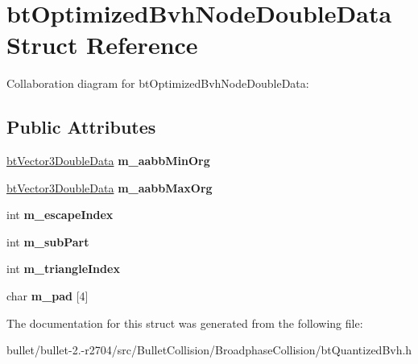 \hypertarget{structbt_optimized_bvh_node_double_data}{\section{bt\+Optimized\+Bvh\+Node\+Double\+Data Struct Reference}
\label{structbt_optimized_bvh_node_double_data}
}


Collaboration diagram for bt\+Optimized\+Bvh\+Node\+Double\+Data\+:
\subsection*{Public Attributes}
\begin{DoxyCompactItemize}
\item 
\hypertarget{structbt_optimized_bvh_node_double_data_ad80b6c98ad8bc8eb09343a9323fbb574}{\hyperlink{structbt_vector3_double_data}{bt\+Vector3\+Double\+Data} {\bfseries m\+\_\+aabb\+Min\+Org}}\label{structbt_optimized_bvh_node_double_data_ad80b6c98ad8bc8eb09343a9323fbb574}

\item 
\hypertarget{structbt_optimized_bvh_node_double_data_ac4af6af6c427e2cf8f1bbe59d2675f4e}{\hyperlink{structbt_vector3_double_data}{bt\+Vector3\+Double\+Data} {\bfseries m\+\_\+aabb\+Max\+Org}}\label{structbt_optimized_bvh_node_double_data_ac4af6af6c427e2cf8f1bbe59d2675f4e}

\item 
\hypertarget{structbt_optimized_bvh_node_double_data_a2908fce871eac515aad788bd9981a295}{int {\bfseries m\+\_\+escape\+Index}}\label{structbt_optimized_bvh_node_double_data_a2908fce871eac515aad788bd9981a295}

\item 
\hypertarget{structbt_optimized_bvh_node_double_data_ae113561e2ba8017196dcfe9a86bc3b56}{int {\bfseries m\+\_\+sub\+Part}}\label{structbt_optimized_bvh_node_double_data_ae113561e2ba8017196dcfe9a86bc3b56}

\item 
\hypertarget{structbt_optimized_bvh_node_double_data_ad515ab97c3b3bac7c048bc29d690ccce}{int {\bfseries m\+\_\+triangle\+Index}}\label{structbt_optimized_bvh_node_double_data_ad515ab97c3b3bac7c048bc29d690ccce}

\item 
\hypertarget{structbt_optimized_bvh_node_double_data_acb889035f678ee96c2d4edc62e7bfd88}{char {\bfseries m\+\_\+pad} \mbox{[}4\mbox{]}}\label{structbt_optimized_bvh_node_double_data_acb889035f678ee96c2d4edc62e7bfd88}

\end{DoxyCompactItemize}


The documentation for this struct was generated from the following file\+:\begin{DoxyCompactItemize}
\item 
bullet/bullet-\/2.-\/r2704/src/\+Bullet\+Collision/\+Broadphase\+Collision/bt\+Quantized\+Bvh.\+h\end{DoxyCompactItemize}
